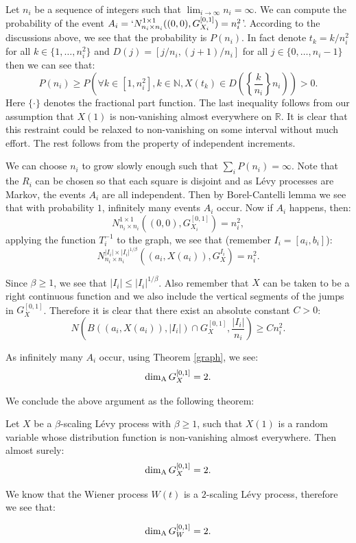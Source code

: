 Let $n_i$ be a sequence of integers such that $\lim_{i\to\infty} n_i=\infty$. We can compute the probability of the event $A_i=`N_{n_i\times n_i}^{1 \times 1 }((0,0),G_{X_i}^{[0,1]})=n_i^2 $'. According to the discussions above, we see that the probability is $P(n_i)$. In fact denote $t_k=k/n^2_i$ for all $k\in\{1,\dots,n^2_i\}$ and $D(j)=[j/n_i,(j+1)/n_i]$ for all $j\in\{0,\dots, n_i-1\}$ then we can see that:
\[
P(n_i)\geq P\left(\forall k\in\left[1,n^2_i\right], k\in \mathbb{N},X(t_k)\in D\left(\left\{\frac{k}{n_i}\right\}n_i\right)\right)>0.
\]
Here $\{ \cdot \}$ denotes the fractional part function. The last inequality follows from our assumption that $X(1)$ is non-vanishing almost everywhere on $\mathbb{R}$. It is clear that this restraint could be relaxed to non-vanishing on some interval without much effort. The rest follows from the property of independent increments.

We can choose $n_i$ to grow slowly enough such that $\sum_{i}P(n_i)=\infty$. Note that the $R_i$ can be chosen so that each square is disjoint and as L\'evy processes are Markov, the events $A_i$ are all independent. Then by Borel-Cantelli lemma we see that with probability $1$, infinitely many events $A_i$ occur. Now if $A_i$ happens, then:
\[
N_{n_i\times n_i}^{1 \times 1 }\left((0,0),G_{X_i}^{[0,1]}\right)=n_i^2,
\]
applying the function $T^{-1}_i$ to the graph, we see that (remember $I_i=[a_i,b_i]$):
\[
N_{n_i\times n_i}^{|I_i| \times |I_i|^{1/\beta} }\left((a_i,X(a_i)),G_{X}^{I_i}\right)=n_i^2.
\]

Since $\beta\geq 1$, we see that $|I_i|\leq |I_i|^{1/\beta}$. Also remember that $X$ can be taken to be a right continuous function and we also include the vertical segments of the jumps in $G^{[0,1]}_X$. Therefore it is clear that there exist an absolute constant $C>0$:
\[
N\left(B\left(\left(a_i,X(a_i)\right),|I_i|\right)\cap G_X^{[0,1]},\frac{|I_i|}{n_i}\right)\geq C n_i^2.
\] 

As infinitely many $A_i$ occur, using Theorem \ref{graph}, we see:
\[
\dim_{\mathrm{A}} G_{X}^{[0,1]}=2.
\]

We conclude the above argument as the following theorem:
\begin{thm}\label{Main}
	Let $X$ be a $\beta$-scaling L\'evy process with $\beta\geq 1$, such that $X(1)$ is a random variable whose distribution function is non-vanishing almost everywhere. Then almost surely:
	\[
	\dim_{\mathrm{A}} G_{X}^{[0,1]}=2.
	\]
\end{thm}

We know that the Wiener process $W(t)$ is a $2$-scaling L\'evy process, therefore we see that:
\begin{cor}
	\[
	\dim_{\mathrm{A}} G_{W}^{[0,1]}=2.
	\]
\end{cor}

